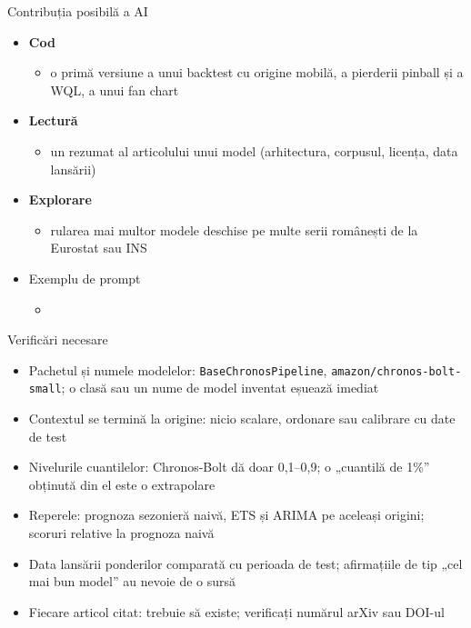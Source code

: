 \begin{frame}{Contribuția posibilă a AI}
\itemsize{\small}
\begin{itemize}
    \item \textbf{Cod}
    \begin{itemize}
        \item o primă versiune a unui backtest cu origine mobilă, a pierderii pinball și a WQL, a unui fan chart
    \end{itemize}
    \item \textbf{Lectură}
    \begin{itemize}
        \item un rezumat al articolului unui model (arhitectura, corpusul, licența, data lansării)
    \end{itemize}
    \item \textbf{Explorare}
    \begin{itemize}
        \item rularea mai multor modele deschise pe multe serii românești de la Eurostat sau INS
    \end{itemize}
    \item Exemplu de prompt
    \begin{itemize}
        \item {}
    \end{itemize}
\end{itemize}
\end{frame}

\begin{frame}{Verificări necesare}
\itemsize{\small}
\begin{itemize}
    \item Pachetul și numele modelelor: \texttt{BaseChronosPipeline}, \texttt{amazon/chronos-bolt-small}; o clasă sau un nume de model inventat eșuează imediat
    \item Contextul se termină la origine: nicio scalare, ordonare sau calibrare cu date de test
    \item Nivelurile cuantilelor: Chronos-Bolt dă doar 0,1--0,9; o „cuantilă de 1\%” obținută din el este o extrapolare
    \item Reperele: prognoza sezonieră naivă, ETS și ARIMA pe aceleași origini; scoruri relative la prognoza naivă
    \item Data lansării ponderilor comparată cu perioada de test; afirmațiile de tip „cel mai bun model” au nevoie de o sursă
    \item Fiecare articol citat: trebuie să existe; verificați numărul arXiv sau DOI-ul
\end{itemize}
\end{frame}


